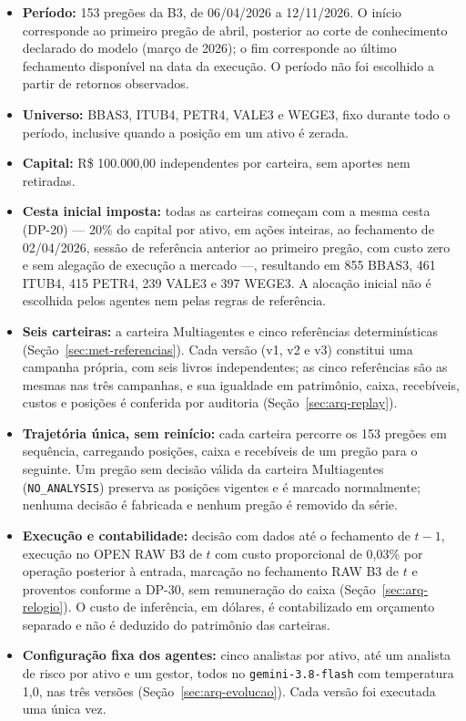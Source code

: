 \documentclass{eic-bcc-tcc}
\begin{document}
\begin{itemize}
    \item \textbf{Período:} 153 pregões da B3, de 06/04/2026 a 12/11/2026. O início corresponde ao primeiro pregão de abril, posterior ao corte de conhecimento declarado do modelo (março de 2026); o fim corresponde ao último fechamento disponível na data da execução. O período não foi escolhido a partir de retornos observados.
    \item \textbf{Universo:} BBAS3, ITUB4, PETR4, VALE3 e WEGE3, fixo durante todo o período, inclusive quando a posição em um ativo é zerada.
    \item \textbf{Capital:} R\$ 100.000,00 independentes por carteira, sem aportes nem retiradas.
    \item \textbf{Cesta inicial imposta:} todas as carteiras começam com a mesma cesta (DP-20) --- 20\% do capital por ativo, em ações inteiras, ao fechamento de 02/04/2026, sessão de referência anterior ao primeiro pregão, com custo zero e sem alegação de execução a mercado ---, resultando em 855 BBAS3, 461 ITUB4, 415 PETR4, 239 VALE3 e 397 WEGE3. A alocação inicial não é escolhida pelos agentes nem pelas regras de referência.
    \item \textbf{Seis carteiras:} a carteira Multiagentes e cinco referências determinísticas (Seção~\ref{sec:met-referencias}). Cada versão (v1, v2 e v3) constitui uma campanha própria, com seis livros independentes; as cinco referências são as mesmas nas três campanhas, e sua igualdade em patrimônio, caixa, recebíveis, custos e posições é conferida por auditoria (Seção~\ref{sec:arq-replay}).
    \item \textbf{Trajetória única, sem reinício:} cada carteira percorre os 153 pregões em sequência, carregando posições, caixa e recebíveis de um pregão para o seguinte. Um pregão sem decisão válida da carteira Multiagentes (\texttt{NO\_ANALYSIS}) preserva as posições vigentes e é marcado normalmente; nenhuma decisão é fabricada e nenhum pregão é removido da série.
    \item \textbf{Execução e contabilidade:} decisão com dados até o fechamento de $t-1$, execução no OPEN RAW B3 de $t$ com custo proporcional de 0,03\% por operação posterior à entrada, marcação no fechamento RAW B3 de $t$ e proventos conforme a DP-30, sem remuneração do caixa (Seção~\ref{sec:arq-relogio}). O custo de inferência, em dólares, é contabilizado em orçamento separado e não é deduzido do patrimônio das carteiras.
    \item \textbf{Configuração fixa dos agentes:} cinco analistas por ativo, até um analista de risco por ativo e um gestor, todos no \texttt{gemini-3.8-flash} com temperatura 1,0, nas três versões (Seção~\ref{sec:arq-evolucao}). Cada versão foi executada uma única vez.
\end{itemize}
\end{document}
